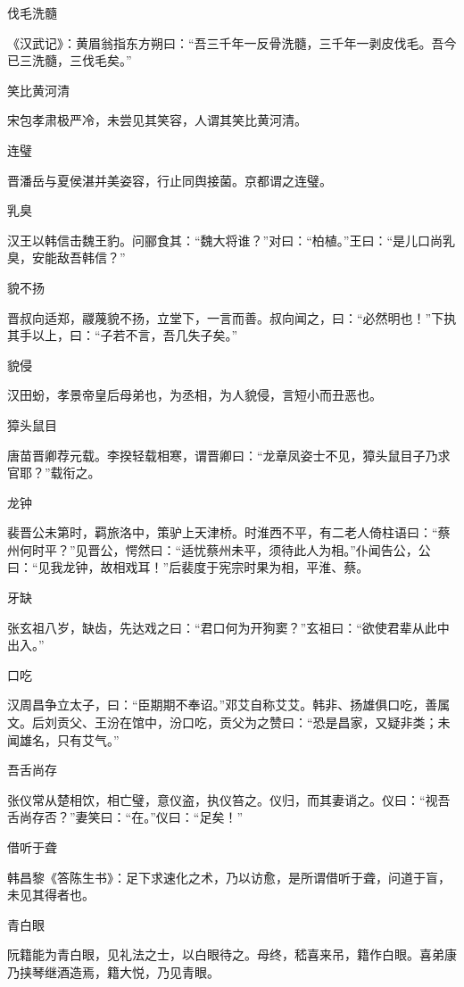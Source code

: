 \documentclass[a4paper,12pt,UTF8,twoside]{ctexbook}
\begin{document}
    伐毛洗髓
    
    《汉武记》：黄眉翁指东方朔曰：“吾三千年一反骨洗髓，三千年一剥皮伐毛。吾今已三洗髓，三伐毛矣。”
    
    笑比黄河清
    
    宋包孝肃极严冷，未尝见其笑容，人谓其笑比黄河清。
    
    连璧
    
    晋潘岳与夏侯湛并美姿容，行止同舆接菌。京都谓之连璧。
    
    乳臭
    
    汉王以韩信击魏王豹。问郦食其：“魏大将谁？”对曰：“柏植。”王曰：“是儿口尚乳臭，安能敌吾韩信？”
    
    貌不扬
    
    晋叔向适郑，鬷蔑貌不扬，立堂下，一言而善。叔向闻之，曰：“必然明也！”下执其手以上，曰：“子若不言，吾几失子矣。”
    
    貌侵
    
    汉田蚡，孝景帝皇后母弟也，为丞相，为人貌侵，言短小而丑恶也。
    
    獐头鼠目
    
    唐苗晋卿荐元载。李揆轻载相寒，谓晋卿曰：“龙章凤姿士不见，獐头鼠目子乃求官耶？”载衔之。
    
    龙钟
    
    裴晋公未第时，羁旅洛中，策驴上天津桥。时淮西不平，有二老人倚柱语曰：“蔡州何时平？”见晋公，愕然曰：“适忧蔡州未平，须待此人为相。”仆闻告公，公曰：“见我龙钟，故相戏耳！”后裴度于宪宗时果为相，平淮、蔡。
    
    牙缺
    
    张玄祖八岁，缺齿，先达戏之曰：“君口何为开狗窦？”玄祖曰：“欲使君辈从此中出入。”
    
    口吃
    
    汉周昌争立太子，曰：“臣期期不奉诏。”邓艾自称艾艾。韩非、扬雄俱口吃，善属文。后刘贡父、王汾在馆中，汾口吃，贡父为之赞曰：“恐是昌家，又疑非类；未闻雄名，只有艾气。”
    
    吾舌尚存
    
    张仪常从楚相饮，相亡璧，意仪盗，执仪笞之。仪归，而其妻诮之。仪曰：“视吾舌尚存否？”妻笑曰：“在。”仪曰：“足矣！”
    
    借听于聋
    
    韩昌黎《答陈生书》：足下求速化之术，乃以访愈，是所谓借听于聋，问道于盲，未见其得者也。
    
    青白眼
    
    阮籍能为青白眼，见礼法之士，以白眼待之。母终，嵇喜来吊，籍作白眼。喜弟康乃挟琴继酒造焉，籍大悦，乃见青眼。
    
\end{document}
